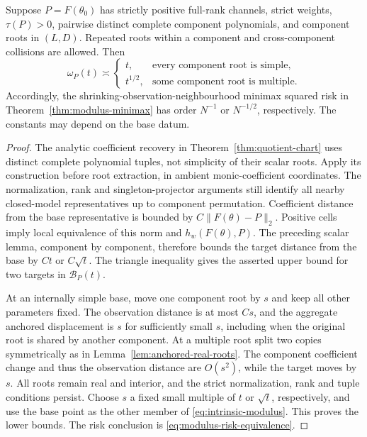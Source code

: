 \begin{theorem}
\label{thm:anchored-multiplicity}
Suppose $P=F(\theta_0)$ has strictly positive full-rank channels, strict
weights, $\tau(P)>0$, pairwise distinct complete component polynomials,
and component roots in $(L,D)$. Repeated roots within a component and
cross-component collisions are allowed. Then
\begin{equation}\label{eq:anchored-exponents}
 \omega_P(t)\asymp
 \begin{cases}
 t,&\text{every component root is simple},\\
 t^{1/2},&\text{some component root is multiple}.
 \end{cases}
\end{equation}
Accordingly, the shrinking-observation-neighbourhood minimax squared
risk in Theorem~\ref{thm:modulus-minimax} has order $N^{-1}$ or
$N^{-1/2}$, respectively. The constants may depend on the base datum.
\end{theorem}
\begin{proof}
The analytic coefficient recovery in
Theorem~\ref{thm:quotient-chart} uses distinct complete polynomial tuples,
not simplicity of their scalar roots. Apply its construction before
root extraction, in ambient monic-coefficient coordinates. The
normalization, rank and singleton-projector arguments still identify
all nearby closed-model representatives up to component permutation.
Coefficient distance from the base representative is bounded by
$C\|F(\theta)-P\|_2$. Positive cells imply local equivalence of this
norm and $h_w(F(\theta),P)$. The preceding scalar lemma, component by
component, therefore bounds the target distance from the base by
$Ct$ or $C\sqrt t$. The triangle inequality gives the asserted upper
bound for two targets in $\mathcal B_P(t)$.

At an internally simple base, move one component root by $s$ and keep
all other parameters fixed. The observation distance is at most $Cs$,
and the aggregate anchored displacement is $s$ for sufficiently small
$s$, including when the original root is shared by another component.
At a multiple root split two copies symmetrically as in
Lemma~\ref{lem:anchored-real-roots}. The component coefficient change
and thus the observation distance are $O(s^2)$, while the target
moves by $s$. All roots remain real and interior, and the strict
normalization, rank and tuple conditions persist. Choose $s$ a fixed
small multiple of $t$ or $\sqrt t$, respectively, and use the base
point as the other member of \eqref{eq:intrinsic-modulus}. This proves
the lower bounds. The risk conclusion is
\eqref{eq:modulus-risk-equivalence}.
\end{proof}

